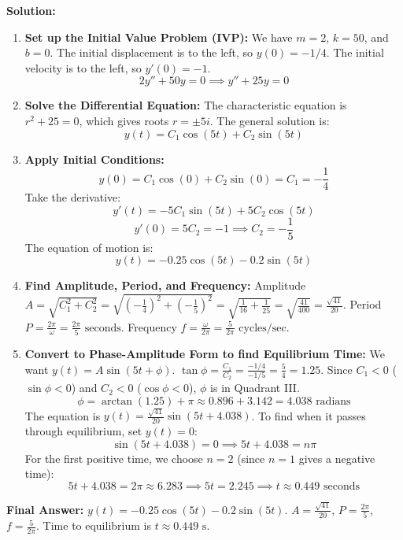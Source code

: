 \documentclass[11pt]{article}
\begin{document}
\textbf{Solution:}
\begin{enumerate}
    \item \textbf{Set up the Initial Value Problem (IVP):}
    We have $m = 2$, $k = 50$, and $b = 0$. The initial displacement is to the left, so $y(0) = -1/4$. The initial velocity is to the left, so $y'(0) = -1$.
    \[ 2y'' + 50y = 0 \implies y'' + 25y = 0 \]
    
    \item \textbf{Solve the Differential Equation:}
    The characteristic equation is $r^2 + 25 = 0$, which gives roots $r = \pm 5i$.
    The general solution is:
    \[ y(t) = C_1 \cos(5t) + C_2 \sin(5t) \]
    
    \item \textbf{Apply Initial Conditions:}
    \[ y(0) = C_1 \cos(0) + C_2 \sin(0) = C_1 = -\frac{1}{4} \]
    Take the derivative:
    \[ y'(t) = -5C_1 \sin(5t) + 5C_2 \cos(5t) \]
    \[ y'(0) = 5C_2 = -1 \implies C_2 = -\frac{1}{5} \]
    The equation of motion is:
    \[ y(t) = -0.25 \cos(5t) - 0.2 \sin(5t) \]
    
    \item \textbf{Find Amplitude, Period, and Frequency:}
    Amplitude $A = \sqrt{C_1^2 + C_2^2} = \sqrt{\left(-\frac{1}{4}\right)^2 + \left(-\frac{1}{5}\right)^2} = \sqrt{\frac{1}{16} + \frac{1}{25}} = \sqrt{\frac{41}{400}} = \frac{\sqrt{41}}{20}$.
    Period $P = \frac{2\pi}{\omega} = \frac{2\pi}{5} \text{ seconds}$.
    Frequency $f = \frac{\omega}{2\pi} = \frac{5}{2\pi} \text{ cycles/sec}$.
    
    \item \textbf{Convert to Phase-Amplitude Form to find Equilibrium Time:}
    We want $y(t) = A \sin(5t + \phi)$.
    $\tan \phi = \frac{C_1}{C_2} = \frac{-1/4}{-1/5} = \frac{5}{4} = 1.25$.
    Since $C_1 < 0$ ($\sin \phi < 0$) and $C_2 < 0$ ($\cos \phi < 0$), $\phi$ is in Quadrant III.
    \[ \phi = \arctan(1.25) + \pi \approx 0.896 + 3.142 = 4.038 \text{ radians} \]
    The equation is $y(t) = \frac{\sqrt{41}}{20} \sin(5t + 4.038)$.
    To find when it passes through equilibrium, set $y(t) = 0$:
    \[ \sin(5t + 4.038) = 0 \implies 5t + 4.038 = n\pi \]
    For the first positive time, we choose $n = 2$ (since $n=1$ gives a negative time):
    \[ 5t + 4.038 = 2\pi \approx 6.283 \implies 5t = 2.245 \implies t \approx 0.449 \text{ seconds} \]
\end{enumerate}
\textbf{Final Answer:} $y(t) = -0.25 \cos(5t) - 0.2 \sin(5t)$. $A = \frac{\sqrt{41}}{20}$, $P = \frac{2\pi}{5}$, $f = \frac{5}{2\pi}$. Time to equilibrium is $t \approx 0.449 \text{ s}$.
\end{document}
